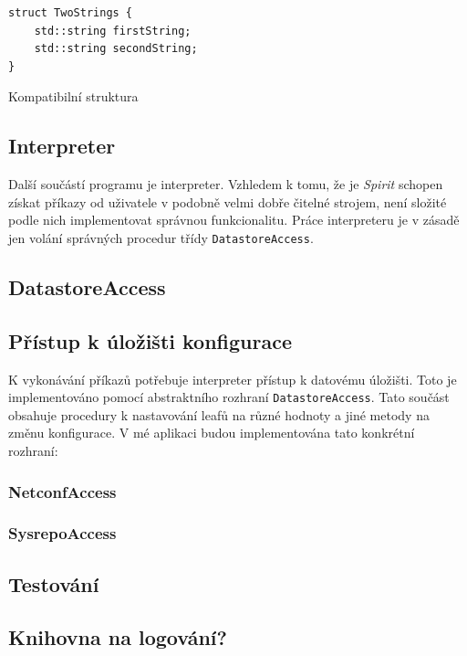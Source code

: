 \documentclass[thesis=B,czech,hidelinks]{FITthesis}[2019/03/06]
\begin{document}
\begin{listing}
\begin{verbatim}
struct TwoStrings {
    std::string firstString;
    std::string secondString;
}
\end{verbatim}
\caption{Kompatibilní struktura}\label{spirit-struct}
\end{listing}



\subsection{Interpreter}
Další součástí programu je interpreter. Vzhledem k tomu, že je \textit{Spirit} schopen získat příkazy od uživatele v podobně velmi dobře čitelné strojem, není složité podle nich implementovat správnou funkcionalitu. Práce interpreteru je v zásadě jen volání správných procedur třídy \texttt{DatastoreAccess}.

\subsection{DatastoreAccess}
\subsection{Přístup k úložišti konfigurace}
K vykonávání příkazů potřebuje interpreter přístup k datovému úložišti. Toto je implementováno pomocí abstraktního rozhraní \texttt{DatastoreAccess}. Tato součást obsahuje procedury k nastavování leafů na různé hodnoty a jiné metody na změnu konfigurace. V mé aplikaci budou implementována tato konkrétní rozhraní:

\subsubsection{NetconfAccess}

\subsubsection{SysrepoAccess}

\subsection{Testování}

\subsection{Knihovna na logování?}
\end{document}
